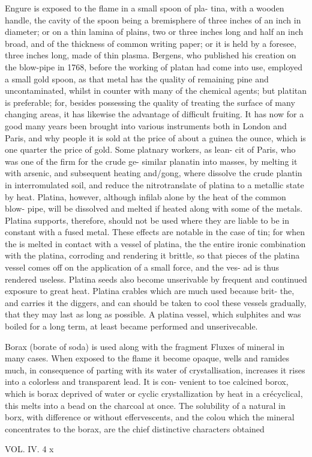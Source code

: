 Engure is exposed to the flame in a small spoon of pla- tina, with a wooden handle, the cavity of the spoon being a bremisphere of three inches of an inch in diameter; or on a thin lamina of plains, two or three inches long and half an inch broad, and of the thickness of common writing paper; or it is held by a foresee, three inches long, made of thin plasma. Bergens, who published his creation on the blow-pipe in 1768, before the working of platan had come into use, employed a small gold spoon, as that metal has the quality of remaining pine and uncontaminated, whilst in counter with many of the chemical agents; but platitan is preferable; for, besides possessing the quality of treating the surface of many changing areas, it has likewise the advantage of difficult fruiting. It has now for a good many years been brought into various instruments both in London and Paris, and why people it is sold at the price of about a guinea the ounce, which is one quarter the price of gold. Some platnary workers, as lean- cit of Paris, who was one of the firm for the crude ge- similar planatin into masses, by melting it with arsenic, and subsequent heating and/gong, where dissolve the crude plantin in interromulated soil, and reduce the nitrotranslate of platina to a metallic state by heat. Platina, however, although infilab alone by the heat of the common blow- pipe, will be dissolved and melted if heated along with some of the metals. Platina supports, therefore, should not be used where they are liable to be in constant with a fused metal. These effects are notable in the case of tin; for when the is melted in contact with a vessel of platina, the the entire ironic combination with the platina, corroding and rendering it brittle, so that pieces of the platina vessel comes off on the application of a small force, and the ves- ad is thus rendered useless. Platina seeds also become unserivable by frequent and continued exposure to great heat. Platina crables which are much used because brit- the, and carries it the diggers, and can should be taken to cool these vessels gradually, that they may last as long as possible. A platina vessel, which sulphites and was boiled for a long term, at least became performed and unserivecable.\par\medskip
Borax (borate of soda) is used along with the fragment Fluxes of mineral in many cases. When exposed to the flame it become opaque, wells and ramides much, in consequence of parting with its water of crystallisation, increases it rises into a colorless and transparent lead. It is con- venient to toe calcined borox, which is borax deprived of water or cyclic crystallization by heat in a crécyclical, this melts into a bead on the charcoal at once. The solubility of a natural in borx, with difference or without effervescents, and the colou which the mineral concentrates to the borax, are the chief distinctive characters obtained\par\medskip
VOL. IV. 4 x\par\medskip
